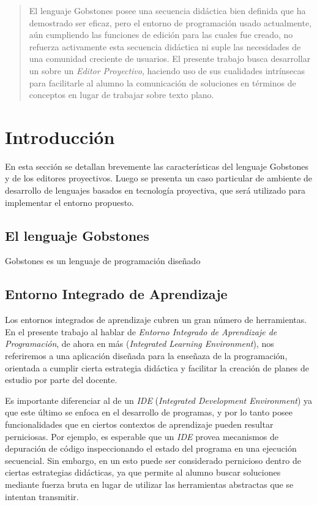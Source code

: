 \begin{abstract}
El lenguaje Gobstones posee una secuencia didáctica bien definida que ha demostrado ser eficaz, pero el entorno de programación usado actualmente, aún cumpliendo las funciones de edición para las cuales fue creado, no refuerza activamente esta secuencia didáctica ni suple las necesidades de una comunidad creciente de usuarios. El presente trabajo busca desarrollar un \ile sobre un \textit{Editor Proyectivo}, haciendo uso de sus cualidades intrínsecas para facilitarle al alumno la comunicación de soluciones en términos de conceptos en lugar de trabajar sobre texto plano.
\end{abstract}


\section{Introducción}

En esta sección se detallan brevemente las características del lenguaje Gobstones y de los editores proyectivos. Luego se presenta un caso particular de ambiente de desarrollo de lenguajes basados en tecnología proyectiva, que será utilizado para implementar el entorno propuesto.


\subsection{El lenguaje Gobstones}

Gobstones\cite{Gobstones} es un lenguaje de programación diseñado 

\subsection{Entorno Integrado de Aprendizaje}

Los entornos integrados de aprendizaje\cite{IntegratedLearningEnvironment} cubren un gran número de herramientas. En el presente trabajo al hablar de \textit{Entorno Integrado de Aprendizaje de Programación}, de ahora en más \ile (\textit{Integrated Learning Environment}), nos referiremos a una aplicación diseñada para la enseñaza de la programación, orientada a cumplir cierta estrategia didáctica y facilitar la creación de planes de estudio por parte del docente. 

Es importante diferenciar al \ile de un \textit{IDE} (\textit{Integrated Development Environment}) ya que este último se enfoca en el desarrollo de programas, y por lo tanto posee funcionalidades que en ciertos contextos de aprendizaje pueden resultar perniciosas. Por ejemplo, es esperable que un \textit{IDE} provea mecanismos de depuración de código inspeccionando el estado del programa en una ejecución secuencial. Sin embargo, en un \ile esto puede ser considerado pernicioso dentro de ciertas estrategias didácticas, ya que permite al alumno buscar soluciones mediante fuerza bruta en lugar de utilizar las herramientas abstractas que se intentan transmitir.

